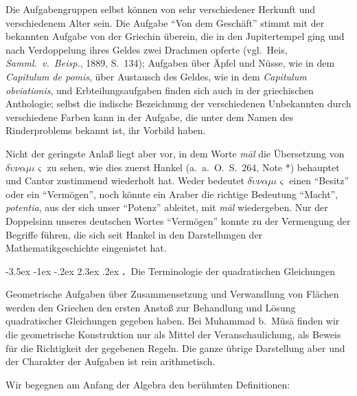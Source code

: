 \documentclass[11pt,a4paper]{article}
\makeatletter
\renewcommand{\section}{\@startsection{section}{1}{\z@}%
  {-3.5ex \@plus -1ex \@minus -.2ex}%
  {2.3ex \@plus .2ex}%
  {\normalfont\Large\bfseries\color{sectioncolor}\thesection.\ }}
\newcommand{\enquote}[1]{``#1''}
\makeatother
\begin{document}
Die Aufgabengruppen selbst k\"onnen von sehr verschiedener Herkunft und verschiedenem Alter sein. Die Aufgabe \enquote{Von dem Gesch\"aft} stimmt mit der bekannten Aufgabe von der Griechin \"uberein, die in den Jupitertempel ging und nach Verdoppelung ihres Geldes zwei Drachmen opferte (vgl.\ Heis, \textit{Samml.\ v.\ Beisp.}, 1889, S.\ 134); Aufgaben \"uber \"Apfel und N\"usse, wie in dem \textit{Capitulum de pomis}, \"uber Austausch des Geldes, wie in dem \textit{Capitulum obviationis}, und Erbteilungsaufgaben finden sich auch in der griechischen Anthologie; selbst die indische Bezeichnung der verschiedenen Unbekannten durch verschiedene Farben kann in der Aufgabe, die unter dem Namen des Rinderproblems bekannt ist, ihr Vorbild haben.

Nicht der geringste Anla\ss{} liegt aber vor, in dem Worte \textit{m\=al} die \"Ubersetzung von $\delta\dot{\upsilon}\nu\alpha\mu\iota\varsigma$ zu sehen, wie dies zuerst Hankel (a.\ a.\ O.\ S.\ 264, Note *) behauptet und Cantor zustimmend wiederholt hat. Weder bedeutet $\delta\dot{\upsilon}\nu\alpha\mu\iota\varsigma$ einen \enquote{Besitz} oder ein \enquote{Verm\"ogen}, noch k\"onnte ein Araber die richtige Bedeutung \enquote{Macht}, \textit{potentia}, aus der sich unser \enquote{Potenz} ableitet, mit \textit{m\=al} wiedergeben. Nur der Doppelsinn unseres deutschen Wortes \enquote{Verm\"ogen} konnte zu der Vermengung der Begriffe f\"uhren, die sich seit Hankel in den Darstellungen der Mathematikgeschichte eingenistet hat.

\clearpage

\section{Die Terminologie der quadratischen Gleichungen}

Geometrische Aufgaben \"uber Zusammensetzung und Verwandlung von Fl\"achen werden den Griechen den ersten Ansto\ss{} zur Behandlung und L\"osung quadratischer Gleichungen gegeben haben. Bei Muhammad b.\ M\"us\=a finden wir die geometrische Konstruktion nur als Mittel der Veranschaulichung, als Beweis f\"ur die Richtigkeit der gegebenen Regeln. Die ganze \"ubrige Darstellung aber und der Charakter der Aufgaben ist rein arithmetisch.

Wir begegnen am Anfang der Algebra den ber\"uhmten Definitionen:
\end{document}
